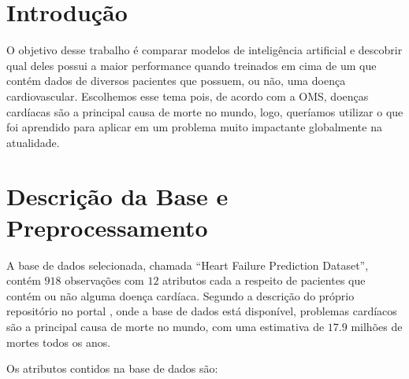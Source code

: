 
\section{Introdução}

  O objetivo desse trabalho é comparar modelos de inteligência artificial e descobrir qual deles possui a maior performance quando treinados em cima de um  que contém dados de diversos pacientes que possuem, ou não, uma doença cardiovascular. Escolhemos esse tema pois, de acordo com a OMS, doenças cardíacas são a principal causa de morte no mundo, logo, queríamos utilizar o que foi aprendido para aplicar em um problema muito impactante globalmente na atualidade.


\section{Descrição da Base e Preprocessamento}

  A base de dados selecionada, chamada ``Heart Failure Prediction Dataset'', contém $918$ observações com $12$ atributos cada a respeito de pacientes que contém ou não alguma doença cardíaca. Segundo a descrição do próprio repositório no portal , onde a base de dados está disponível, problemas cardíacos são a principal causa de morte no mundo, com uma estimativa de $17.9$ milhões de mortes todos os anos.\cite{fedesorianoheartfailure2021}


  Os atributos contidos na base de dados são:

